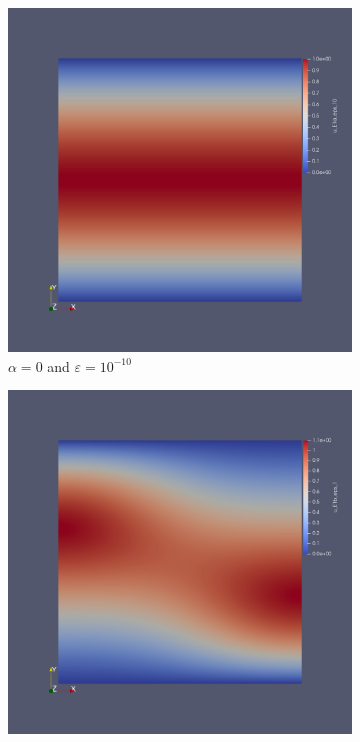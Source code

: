 \documentclass[12pt,a4paper]{article}
\begin{document}
\begin{figure}[H]
\begin{subfigure}{0.44\textwidth}
     \includegraphics[width=\textwidth]{Pics/uf/U_E1a_eps10.png}
     \caption{$\alpha=0$ and $\varepsilon = 10^{-10}$}
 \end{subfigure}
 \begin{subfigure}{0.44\textwidth}
     \includegraphics[width=\textwidth]{Pics/uf/U_E1b_eps1.png}

\end{subfigure}
\end{figure}
\end{document}
